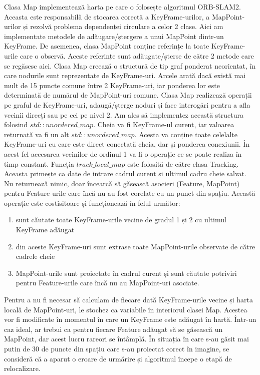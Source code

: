 \documentclass[12pt,a4paper]{report}
\begin{document}
Clasa Map implementează harta pe care o folosește algoritmul ORB-SLAM2. Aceasta este responsabilă
de stocarea corectă a KeyFrame-urilor, a MapPoint-urilor și rezolvă problema dependenței circulare
a celor 2 clase. Aici am implementate metodele de adăugare/ștergere a unui MapPoint dintr-un KeyFrame.
De asemenea, clasa MapPoint conține referințe la toate KeyFrame-urile care o observă. Aceste 
referințe sunt adăugate/șterse de către 2 metode care se regăsesc aici. Clasa Map creează o 
structură de tip graf ponderat neorientat, în care nodurile sunt reprezentate de KeyFrame-uri. 
Arcele arată dacă există mai mult de 15 puncte comune între 2 KeyFrame-uri, iar ponderea lor este 
determinată de numărul de MapPoint-uri comune. Clasa Map realizează operații pe graful de KeyFrame-uri,
adaugă/șterge noduri și face interogări pentru a afla vecinii direcți sau pe cei pe nivel 2. Am ales 
să implementez această structura folosind $ std::unordered\_map $. Cheia va fi KeyFrame-ul 
curent, iar valoarea returnată va fi un alt $ std::unordered\_map $. Acesta va conține toate celelalte
KeyFrame-uri cu care este direct conectată cheia, dar și ponderea conexiunii.
În acest fel accesarea vecinilor de ordinul 1 va fi o operație ce se poate realiza în timp constant.
Funcția $ track\_local\_map $ este folosită de către clasa Tracking. Aceasta primește ca date 
de intrare cadrul curent și ultimul cadru cheie salvat. Nu returnează nimic, doar încearcă 
să găsească asocieri (Feature, MapPoint) pentru Feature-urile care încă nu au fost corelate cu un punct 
din spațiu. Această operație este costisitoare și funcționează în felul următor:
\begin{enumerate}
    \item sunt căutate toate KeyFrame-urile vecine de gradul 1 și 2 cu ultimul KeyFrame adăugat
    \item din aceste KeyFrame-uri sunt extrase toate MapPoint-urile observate de către cadrele cheie 
    \item MapPoint-urile sunt proiectate în cadrul curent și sunt căutate potriviri pentru Feature-urile
care încă nu au MapPoint-uri asociate.
\end{enumerate}
Pentru a nu fi necesar să calculam de fiecare dată KeyFrame-urile vecine și  
harta locală de MapPoint-uri, le stochez ca variabile în interiorul clasei Map. Acestea vor 
fi modificate în momentul în care un KeyFrame este adăugat în hartă. Într-un caz ideal, ar 
trebui ca pentru fiecare Feature adăugat să se găsească un MapPoint, dar acest lucru rareori 
se întâmplă. În situația în care s-au găsit mai putin de 30 de puncte din spațiu care s-au 
proiectat corect în imagine, se consideră că a aparut o eroare de urmărire și algoritmul începe o
etapă de relocalizare. \\
\end{document}
